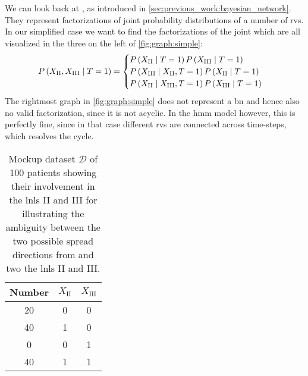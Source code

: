 \documentclass[\relativeRoot/main.tex]{subfiles}
\begin{document}
We can look back at , as introduced in \cref{sec:previous_work:bayesian_network}. They represent factorizations of joint probability distributions of a number of \glspl{rv}. In our simplified case we want to find the factorizations of the joint which are all visualized in the three  on the left of \cref{fig:graph:simple}:
%
\begin{equation}
    P \left( X_\text{II}, X_\text{III} \mid T=1 \right) = \begin{cases}
        P \left( X_\text{II} \mid T=1 \right) P \left( X_\text{III} \mid T=1 \right) \\
        P \left( X_\text{III} \mid X_\text{II}, T=1 \right) P \left( X_\text{II} \mid T=1 \right) \\
        P \left( X_\text{II} \mid X_\text{III}, T=1 \right) P \left( X_\text{III} \mid T=1 \right)
    \end{cases}
\end{equation}
%
The rightmost graph in \cref{fig:graph:simple} does not represent a \acrfull{bn} and hence also no valid factorization, since it is not acyclic. In the \gls{hmm} model however, this is perfectly fine, since in that case different \glspl{rv} are connected across time-steps, which resolves the cycle.

\begin{table}
    \centering
    \begin{tabular}{|c|cc|}
        \hline
        Number & $X_\text{II}$ & $X_\text{III}$ \\
        \hline
        20 & 0 & 0 \\
        40 & 1 & 0 \\
         0 & 0 & 1 \\
        40 & 1 & 1 \\
        \hline
    \end{tabular}
    \caption[
        Mockup dataset for thought experiment
    ]{
        Mockup dataset $\boldsymbol{\mathcal{D}}$ of 100 patients showing their involvement in the \glspl{lnl} II and III for illustrating the ambiguity between the two possible spread directions from and two the \glspl{lnl} II and III.
    }
    \label{table:graph:simple:mockup}
\end{table}
\end{document}
